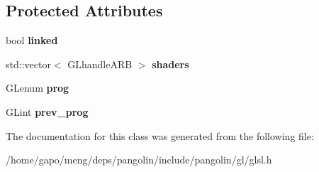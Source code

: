 \subsection*{Protected Attributes}
\begin{DoxyCompactItemize}
\item 
bool {\bfseries linked}\hypertarget{classpangolin_1_1_gl_sl_program_a451702d087219a5e434b80d935d25ad8}{}\label{classpangolin_1_1_gl_sl_program_a451702d087219a5e434b80d935d25ad8}

\item 
std\+::vector$<$ G\+Lhandle\+A\+RB $>$ {\bfseries shaders}\hypertarget{classpangolin_1_1_gl_sl_program_ad273d9dc9b3c1262d225ad82530bea6a}{}\label{classpangolin_1_1_gl_sl_program_ad273d9dc9b3c1262d225ad82530bea6a}

\item 
G\+Lenum {\bfseries prog}\hypertarget{classpangolin_1_1_gl_sl_program_a16644db3f31e33995eac41949c4344d8}{}\label{classpangolin_1_1_gl_sl_program_a16644db3f31e33995eac41949c4344d8}

\item 
G\+Lint {\bfseries prev\+\_\+prog}\hypertarget{classpangolin_1_1_gl_sl_program_aa4e51f100762bfd3599843ccdebc2714}{}\label{classpangolin_1_1_gl_sl_program_aa4e51f100762bfd3599843ccdebc2714}

\end{DoxyCompactItemize}


The documentation for this class was generated from the following file\+:\begin{DoxyCompactItemize}
\item 
/home/gapo/meng/deps/pangolin/include/pangolin/gl/glsl.\+h\end{DoxyCompactItemize}
